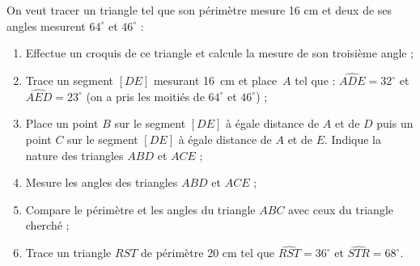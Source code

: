 \begin{exercice}
On veut tracer un triangle tel que son périmètre mesure 16 cm et deux de ses angles mesurent $64^\circ$ et $46^\circ$ :
\begin{enumerate}
 \item Effectue un croquis de ce triangle et calcule la mesure de son troisième angle ;
 \item Trace un segment $[DE]$ mesurant 16 cm et place $A$ tel que : $\widehat{ADE} = 32^\circ$ et $\widehat{AED} = 23^\circ$ (on a pris les moitiés de $64^\circ$ et $46^\circ$) ;
 \item Place un point $B$ sur le segment $[DE]$ à égale distance de $A$ et de $D$ puis un point $C$ sur le segment $[DE]$ à égale distance de $A$ et de $E$. Indique la nature des triangles $ABD$ et $ACE$ ;
 \item Mesure les angles des triangles $ABD$ et $ACE$ ;
 \item Compare le périmètre et les angles du triangle $ABC$ avec ceux du triangle cherché ;
 \item Trace un triangle $RST$ de périmètre 20 cm tel que $\widehat{RST} = 36^\circ$ et $\widehat{STR} = 68^\circ$.
 \end{enumerate}
\end{exercice}



